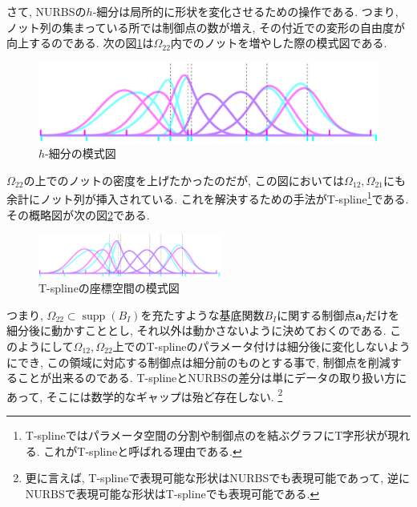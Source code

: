 \documentclass{jsarticle}
\DeclareMathOperator{\supp}{supp}
\theoremstyle{definition}%
\begin{document}
さて, NURBSの$h$-細分は局所的に形状を変化させるための操作である.
つまり, ノット列の集まっている所では制御点の数が増え, その付近での変形の自由度が向上するのである.
次の図\ref{Fig603}は$\Omega_{22}$内でのノットを増やした際の模式図である.
\begin{figure}[H]
	\centering
    \includegraphics[page=6,clip,width=120mm]{figA.pdf}
    \caption{$h$-細分の模式図}
	\label{Fig603}
\end{figure}
$\Omega_{22}$の上でのノットの密度を上げたかったのだが, この図においては$\Omega_{12}, \Omega_{21}$にも余計にノット列が挿入されている.
これを解決するための手法がT-spline\footnote{T-splineではパラメータ空間の分割や制御点のを結ぶグラフにT字形状が現れる. これがT-splineと呼ばれる理由である.}である.
その概略図が次の図\ref{Fig604}である.
\begin{figure}[H]
	\centering
    \includegraphics[page=7,clip,width=60mm]{figA.pdf}
    \caption{T-splineの座標空間の模式図}
	\label{Fig604}
\end{figure}
つまり, $\Omega_{22}\subset\supp(B_I)$を充たすような基底関数$B_I$に関する制御点$\bm{a}_I$だけを細分後に動かすこととし, それ以外は動かさないように決めておくのである.
このようにして$\Omega_{12},\Omega_{22}$上でのT-splineのパラメータ付けは細分後に変化しないようにでき, この領域に対応する制御点は細分前のものとする事で, 制御点を削減することが出来るのである.
T-splineとNURBSの差分は単にデータの取り扱い方にあって, そこには数学的なギャップは殆ど存在しない.%
\footnote{更に言えば, T-splineで表現可能な形状はNURBSでも表現可能であって, 逆にNURBSで表現可能な形状はT-splineでも表現可能である.}
\end{document}
